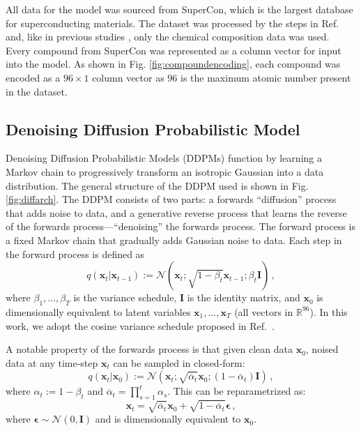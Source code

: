 \documentclass[%
reprint,
 amsmath,amssymb,
 aps,
prb,
]{revtex4-2}
\begin{document}
All data for the model was sourced from SuperCon\cite{supercondataset}, which is the largest database for superconducting materials. The dataset was processed by the steps in Ref.~\cite{Kim_2024} and, like in previous studies \cite{ROTER20201353689,ROTER20221354078,Kim_2024}, only the chemical composition data was used. Every compound from SuperCon was represented as a column vector for input into the model. As shown in Fig. \ref{fig:compoundencoding}, each compound was encoded as a $96 \times 1$ column vector as $96$ is the maximum atomic number present in the dataset.


\subsection{Denoising Diffusion Probabilistic Model}
\label{sec:ddpm}


Denoising Diffusion Probabilistic Models (DDPMs) \cite{ho2020denoising, pmlr-v37-sohl-dickstein15} function by learning a Markov chain to progressively transform an isotropic Gaussian into a data distribution. The general structure of the DDPM used is shown in Fig. \ref{fig:diffarch}. The DDPM consists of two parts: a forwards ``diffusion'' process that adds noise to data, and a generative reverse process that learns the reverse of the forwards process---``denoising'' the forwards process. The forward process is a fixed Markov chain that gradually adds Gaussian noise to data. Each step in the forward process is defined as
\begin{equation}
    q(\mathbf{x}_t | \mathbf{x}_{t-1}) := \mathcal{N}(\mathbf{x}_t; \sqrt{1-\beta_t}\mathbf{x}_{t-1}; \beta_t\mathbf{I})\, ,
\end{equation}
where $\beta_1, ..., \beta_T$ is the variance schedule, $\mathbf{I}$ is the identity matrix, and $\mathbf{x}_0$ is dimensionally equivalent to latent variables $\mathbf{x}_1, ..., \mathbf{x}_T$ (all vectors in $\mathbb{R}^{96}$). In this work, we adopt the cosine variance schedule proposed in Ref.~\cite{nichol2021improved}. 

A notable property of the forwards process is that given clean data $\mathbf{x}_0$, noised data at any time-step $\mathbf{x}_t$ can be sampled in closed-form:
\begin{equation}
    q(\mathbf{x}_t | \mathbf{x}_0) := \mathcal{N}(\mathbf{x}_t; \sqrt{\overline{\alpha}_t}\mathbf{x}_{0}; (1-\overline{\alpha}_t)\mathbf{I})\, ,\label{eq:2}
\end{equation}
where $\alpha_t := 1-\beta_t$ and $\overline{\alpha}_t = \prod_{s=1}^{t} \alpha_s$. This can be reparametrized \cite{kingma2022autoencoding} as:
\begin{equation}
    \mathbf{x}_t = \sqrt{\overline{\alpha}_t}\mathbf{x}_0 + \sqrt{1 - \overline{\alpha}_t}\bm{\epsilon}\, ,
\end{equation}
where $\bm{\epsilon} \sim \mathcal{N}(0, \mathbf{I})$ and is dimensionally equivalent to $\mathbf{x}_0$.
\end{document}
